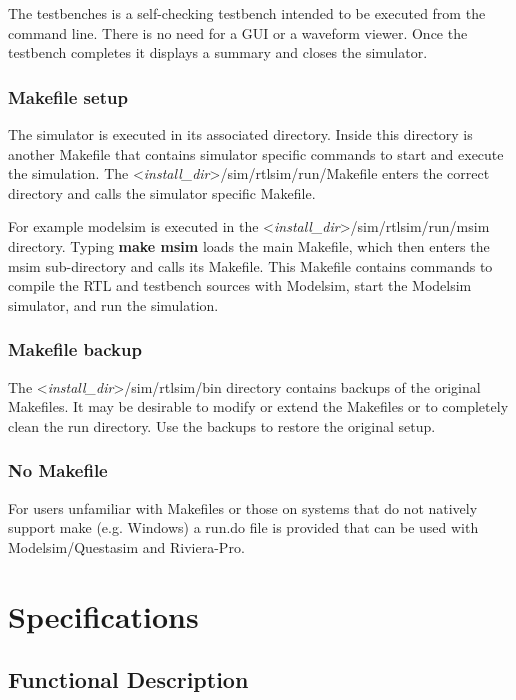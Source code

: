 The testbenches is a self-checking testbench intended to be executed
from the command line. There is no need for a GUI or a waveform viewer.
Once the testbench completes it displays a summary and closes the
simulator.

\subsubsection{Makefile setup}\label{makefile-setup}

The simulator is executed in its associated directory. Inside this
directory is another Makefile that contains simulator specific commands
to start and execute the simulation. The
\textless{}\emph{install\_dir}\textgreater{}/sim/rtlsim/run/Makefile
enters the correct directory and calls the simulator specific Makefile.

For example modelsim is executed in the
\textless{}\emph{install\_dir}\textgreater{}/sim/rtlsim/run/msim
directory. Typing \textbf{make msim} loads the main Makefile, which then
enters the msim sub-directory and calls its Makefile. This Makefile
contains commands to compile the RTL and testbench sources with
Modelsim, start the Modelsim simulator, and run the simulation.

\subsubsection{Makefile backup}\label{makefile-backup}

The \textless{}\emph{install\_dir}\textgreater{}/sim/rtlsim/bin
directory contains backups of the original Makefiles. It may be
desirable to modify or extend the Makefiles or to completely clean the
run directory. Use the backups to restore the original setup.

\subsubsection{No Makefile}\label{no-makefile}

For users unfamiliar with Makefiles or those on systems that do not
natively support make (e.g. Windows) a run.do file is provided that can
be used with Modelsim/Questasim and Riviera-Pro.

\section{Specifications}\label{specifications}

\subsection{Functional Description}\label{functional-description}

